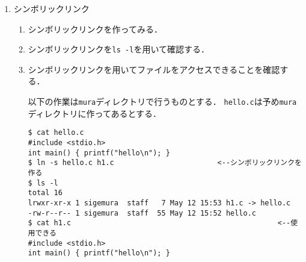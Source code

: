 \documentclass[a4j,twcolumn,11pt,nomag]{ltjarticle}      %
\begin{document}
\begin{enumerate}
\begin{enumerate}
カレントディレクトリは\texttt{/tmp/mura/SysPro}なので，
\texttt{/tmp/mura/hello.c}を特定する相対パスは\texttt{../hello.c}になる．

\begin{lstlisting}[numbers=none]
$ cat ../hello.c
#include <stdio.h>
int main() { printf("hello\n"); }
\end{lstlisting}

\item 課題のために作成したファイルやディレクトリを全て削除する．

\begin{lstlisting}[numbers=none]
$ cd ../..
$ rm mura/SysPro/ex1.c
$ rmdir mura/SysPro
$ rm mura/hello.c
$ rm mura/h1.c
$ rmdir mura
\end{lstlisting}

\item ディレクトリのハードリンクができるか試す．

試すとエラーが発生しリンクできないことが分かる．\\
（実は，ファイル木が複雑になりすぎるので禁止されている．）

\begin{lstlisting}[numbers=none]
$ mkdir DIR
$ ln DIR dir
ln: DIR: Is a directory
\end{lstlisting}

\end{enumerate}

\item シンボリックリンク


\begin{enumerate}
\item シンボリックリンクを作ってみる．
\item シンボリックリンクを{\tt ls -l}を用いて確認する．
\item シンボリックリンクを用いてファイルをアクセスできることを確認する．

以下の作業は{\tt mura}ディレクトリで行うものとする．
{\tt hello.c}は予め{\tt mura}ディレクトリに作ってあるとする．

\begin{lstlisting}[numbers=none]
$ cat hello.c
#include <stdio.h>
int main() { printf("hello\n"); }
$ ln -s hello.c h1.c                        <--シンボリックリンクを作る
$ ls -l
total 16
lrwxr-xr-x 1 sigemura  staff   7 May 12 15:53 h1.c -> hello.c
-rw-r--r-- 1 sigemura  staff  55 May 12 15:52 hello.c
$ cat h1.c                                                <--使用できる
#include <stdio.h>
int main() { printf("hello\n"); }
\end{lstlisting}


\end{enumerate}
\end{enumerate}
\end{document}
